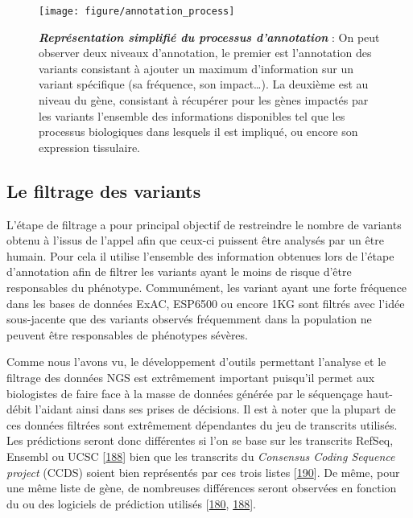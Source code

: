 \documentclass[12pt,a4paper,twoside]{ugathesis}
\theoremstyle{definition}
\theoremstyle{definition}
\theoremstyle{definition}
\theoremstyle{remark}
\begin{document}
\begin{figure}

{\centering \texttt{[image: figure/annotation\_process]} 

}

\caption[Représentation simplifié du processus d'annotation]{\textbf{\emph{Représentation simplifié du processus
d'annotation}} : On peut observer deux niveaux d'annotation, le premier
est l'annotation des variants consistant à ajouter un maximum
d'information sur un variant spécifique (sa fréquence, son
impact\ldots{}). La deuxième est au niveau du gène, consistant à
récupérer pour les gènes impactés par les variants l'ensemble des
informations disponibles tel que les processus biologiques dans lesquels
il est impliqué, ou encore son expression tissulaire.}\label{fig:pictannot}
\end{figure}










\newpage

\subsection{Le filtrage des variants}\label{le-filtrage-des-variants}

L'étape de filtrage a pour principal objectif de restreindre le nombre
de variants obtenu à l'issus de l'appel afin que ceux-ci puissent être
analysés par un être humain. Pour cela il utilise l'ensemble des
information obtenues lors de l'étape d'annotation afin de filtrer les
variants ayant le moins de risque d'être responsables du phénotype.
Communément, les variant ayant une forte fréquence dans les bases de
données ExAC, ESP6500 ou encore 1KG sont filtrés avec l'idée
sous-jacente que des variants observés fréquemment dans la population ne
peuvent être responsables de phénotypes sévères.

Comme nous l'avons vu, le développement d'outils permettant l'analyse et
le filtrage des données NGS est extrêmement important puisqu'il permet
aux biologistes de faire face à la masse de données générée par le
séquençage haut-débit l'aidant ainsi dans ses prises de décisions. Il
est à noter que la plupart de ces données filtrées sont extrêmement
dépendantes du jeu de transcrits utilisés. Les prédictions seront donc
différentes si l'on se base sur les transcrits RefSeq, Ensembl ou UCSC
{[}\protect\hyperlink{ref-McCarthy2014}{188}{]} bien que les transcrits
du \emph{Consensus Coding Sequence project} (CCDS) soient bien
représentés par ces trois listes
{[}\protect\hyperlink{ref-Pruitt2009}{190}{]}. De même, pour une même
liste de gène, de nombreuses différences seront observées en fonction du
ou des logiciels de prédiction utilisés
{[}\protect\hyperlink{ref-Salgado2016}{180},
\protect\hyperlink{ref-McCarthy2014}{188}{]}.
\end{document}
